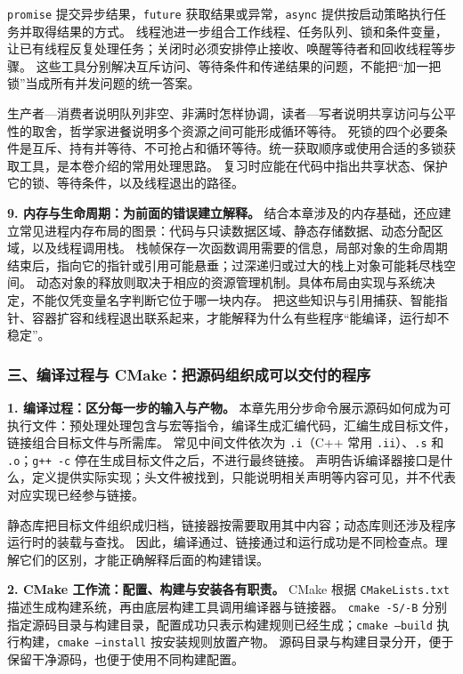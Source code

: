 \texttt{promise} 提交异步结果，\texttt{future} 获取结果或异常，\texttt{async} 提供按启动策略执行任务并取得结果的方式。
线程池进一步组合工作线程、任务队列、锁和条件变量，让已有线程反复处理任务；关闭时必须安排停止接收、唤醒等待者和回收线程等步骤。
这些工具分别解决互斥访问、等待条件和传递结果的问题，不能把“加一把锁”当成所有并发问题的统一答案。

生产者—消费者说明队列非空、非满时怎样协调，读者—写者说明共享访问与公平性的取舍，哲学家进餐说明多个资源之间可能形成循环等待。
死锁的四个必要条件是互斥、持有并等待、不可抢占和循环等待。统一获取顺序或使用合适的多锁获取工具，是本卷介绍的常用处理思路。
复习时应能在代码中指出共享状态、保护它的锁、等待条件，以及线程退出的路径。

\textbf{9. 内存与生命周期：为前面的错误建立解释。}
结合本章涉及的内存基础，还应建立常见进程内存布局的图景：代码与只读数据区域、静态存储数据、动态分配区域，以及线程调用栈。
栈帧保存一次函数调用需要的信息，局部对象的生命周期结束后，指向它的指针或引用可能悬垂；过深递归或过大的栈上对象可能耗尽栈空间。
动态对象的释放则取决于相应的资源管理机制。具体布局由实现与系统决定，不能仅凭变量名字判断它位于哪一块内存。
把这些知识与引用捕获、智能指针、容器扩容和线程退出联系起来，才能解释为什么有些程序“能编译，运行却不稳定”。

\subsubsection*{三、编译过程与 CMake：把源码组织成可以交付的程序}

\textbf{1. 编译过程：区分每一步的输入与产物。}
本章先用分步命令展示源码如何成为可执行文件：预处理处理包含与宏等指令，编译生成汇编代码，汇编生成目标文件，链接组合目标文件与所需库。
常见中间文件依次为 \texttt{.i}（C++ 常用 \texttt{.ii}）、\texttt{.s} 和 \texttt{.o}；\texttt{g++ -c} 停在生成目标文件之后，不进行最终链接。
声明告诉编译器接口是什么，定义提供实际实现；头文件被找到，只能说明相关声明等内容可见，并不代表对应实现已经参与链接。

静态库把目标文件组织成归档，链接器按需要取用其中内容；动态库则还涉及程序运行时的装载与查找。
因此，编译通过、链接通过和运行成功是不同检查点。理解它们的区别，才能正确解释后面的构建错误。

\textbf{2. CMake 工作流：配置、构建与安装各有职责。}
CMake 根据 \texttt{CMakeLists.txt} 描述生成构建系统，再由底层构建工具调用编译器与链接器。
\texttt{cmake -S/-B} 分别指定源码目录与构建目录，配置成功只表示构建规则已经生成；\texttt{cmake --build} 执行构建，\texttt{cmake --install} 按安装规则放置产物。
源码目录与构建目录分开，便于保留干净源码，也便于使用不同构建配置。

